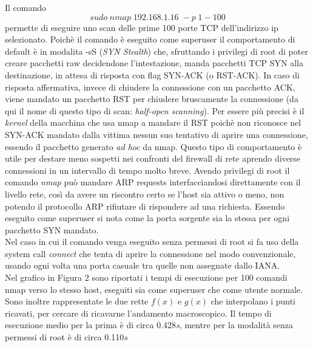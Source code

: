 \documentclass{article}
\begin{document}
Il comando $$sudo\; nmap \;192.168.1.16\; -p \; 1-100$$ permette di eseguire uno scan delle prime 
100 porte TCP dell'indirizzo ip selezionato. Poichè il comando è eseguito come superuser
il comportamento di default è in modalita -sS (\textit{SYN Stealth}) che, sfruttando i privilegi
di root di poter creare pacchetti raw decidendone l'intestazione,
 manda pacchetti TCP SYN alla destinazione, in attesa di risposta con flag SYN-ACK (o RST-ACK). In caso di risposta 
affermativa, invece di chiudere la connessione con un pacchetto ACK, viene mandato un pacchetto
RST per chiudere bruscamente la connessione (da qui il nome di questo tipo di scan: \textit{half-open scanning}). 
Per essere più precisi è il \textit{kernel} della macchina che usa nmap a mandare il RST poichè non riconosce nel SYN-ACK mandato
dalla vittima nessun suo tentativo di aprire una connessione, essendo il pacchetto generato \textit{ad hoc} da nmap.
Questo tipo di comportamento è utile per destare meno sospetti nei confronti del firewall di rete aprendo diverse connessioni 
in un intervallo di tempo molto breve.
Avendo privilegi di root il comando \textit{nmap} può mandare ARP requests interfacciandosi 
direttamente con il livello rete, così da avere un riscontro certo se l'host sia attivo o meno, non potendo
il protocollo ARP rifiutare di rispondere ad una richiesta. Essendo eseguito come superuser si nota come la porta
sorgente sia la stessa per ogni pacchetto SYN mandato.\\
Nel caso in cui il comando venga eseguito senza permessi di root si fa uso della system call \textit{connect} che tenta di aprire la connessione
nel modo convenzionale, usando ogni volta una porta casuale tra quelle non assegnate dallo IANA. \\ Nel grafico in Figura 2 sono riportati i tempi 
di esecuzione per 100 comandi nmap verso lo stesso host, eseguiti sia come superuser che come utente normale. Sono inoltre rappresentate le due rette $f(x)$ e $g(x)$
che interpolano i punti ricavati, per cercare di ricavarne l'andamento macroscopico. Il tempo di esecuzione medio per la prima è di circa 0.428\textit{s}, mentre per
la modalità senza permessi di root è di circa 0.110\textit{s}
\end{document}
